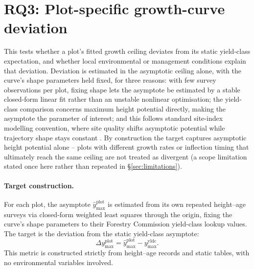 {\section{RQ3: Plot-specific growth-curve deviation}
\label{sec:rq3-target}
This tests whether a plot's fitted growth ceiling deviates from its static yield-class expectation, and whether local environmental or management conditions explain that deviation. Deviation is estimated in the asymptotic ceiling alone, with the curve's shape parameters held fixed, for three reasons: with few survey observations per plot, fixing shape lets the asymptote be estimated by a stable closed-form linear fit rather than an unstable nonlinear optimisation; the yield-class comparison concerns maximum height potential directly, making the asymptote the parameter of interest; and this follows standard site-index modelling convention, where site quality shifts asymptotic potential while trajectory shape stays constant \citep{socha2021Regional_C2_CR}. By construction the target captures asymptotic height potential alone -- plots with different growth rates or inflection timing that ultimately reach the same ceiling are not treated as divergent (a scope limitation stated once here rather than repeated in \S\ref{sec:limitations}).

\paragraph*{Target construction.}
For each plot, the asymptote $\hat{y}_{\max}^{\text{plot}}$ is estimated from its own repeated height--age surveys via closed-form weighted least squares through the origin, fixing the curve's shape parameters to their Forestry Commission yield-class lookup values. The target is the deviation from the static yield-class asymptote:
\begin{equation}
\Delta y_{\max}^{\text{plot}} = \hat y_{\max}^{\text{plot}} - y_{\max}^{\text{yldc}}.
\label{eq:local-ymax-diff}
\end{equation}
This metric is constructed strictly from height--age records and static tables, with no environmental variables involved.

}
